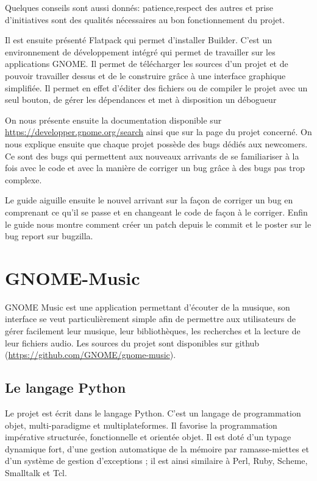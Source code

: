 \documentclass[12pt]{report}
\begin{document}
Quelques conseils sont aussi donnés: patience,respect des autres et prise
d'initiatives sont des qualités nécessaires au bon fonctionnement du projet.

Il est ensuite présenté Flatpack qui permet d'installer Builder.
C'est un environnement de développement intégré qui permet de travailler
sur les applications GNOME. Il permet de télécharger les sources d'un
projet et de pouvoir travailler dessus et de le construire grâce à une
interface graphique simplifiée. Il permet en effet d'éditer des fichiers
ou de compiler le projet avec un seul bouton, de gérer les dépendances
et met à disposition un débogueur

On nous présente ensuite la documentation disponible sur
\url{https://developper.gnome.org/search}
ainsi que sur la page du projet concerné. On nous explique ensuite que
chaque projet possède des bugs dédiés aux newcomers. Ce sont des bugs
qui permettent aux nouveaux arrivants de se familiariser à la fois avec
le code et avec la manière de corriger un bug grâce à des bugs pas trop
complexe.

Le guide aiguille ensuite le nouvel arrivant sur la façon de corriger
un bug en comprenant ce qu'il se passe et en changeant le code de
façon à le corriger. Enfin le guide nous montre comment créer un
patch depuis le commit et le poster sur le bug report sur bugzilla.


\newpage
\chapter{GNOME-Music}
GNOME Music est une application permettant d'écouter de la musique, 
son interface se veut particulièrement simple afin de permettre aux
utilisateurs de gérer facilement leur musique, leur bibliothèques, 
les recherches et la lecture de leur fichiers audio.
Les sources du projet sont disponibles sur github 
(\url{https://github.com/GNOME/gnome-music}).

\section{Le langage Python}
Le projet est écrit dans le langage Python. C'est un langage de
programmation objet, multi-paradigme et multiplateformes. Il favorise la
programmation impérative structurée, fonctionnelle et orientée objet. 
Il est doté d'un typage dynamique fort, d'une gestion automatique de la 
mémoire par ramasse-miettes et d'un système de gestion d'exceptions ; 
il est ainsi similaire à Perl, Ruby, Scheme, Smalltalk et Tcl.
\end{document}
